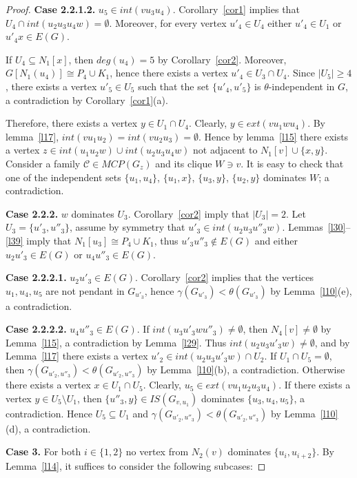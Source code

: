 \documentclass[12pt]{article}
\begin{document}
\begin{proof}
\textbf{Case 2.2.1.2.} $u_5 \in int(vu_3u_4)$. Corollary~\ref{cor1} implies that $U_4 \cap int(u_2u_3u_4w) = \emptyset$. Moreover, for every vertex $u'_4 \in U_4$ either $u'_4 \in U_1$ or $u'_4x \in E(G)$. 

If $U_4 \subseteq N_1[x]$, then $deg(u_4) = 5$ by Corollary~\ref{cor2}. Moreover, $G[N_1(u_4)] \cong P_4 \cup K_1$, hence there exists a vertex $u'_4 \in U_3 \cap U_4$. Since $|U_5| \geq 4$, there exists a vertex $u'_5 \in U_5$ such that the set $\{u'_4,u'_5\}$ is $\theta$-independent in $G$, a contradiction by Corollary~\ref{cor1}(a). 

Therefore, there exists a vertex $y \in U_1 \cap U_4$. Clearly, $y \in ext(vu_1wu_4)$. By lemma~\ref{l17}, $int(vu_1u_2) = int(vu_2u_3) = \emptyset$. Hence by lemma~\ref{l15} there exists a vertex $z \in int(u_1u_2w) \cup int(u_2u_3u_4w)$ not adjacent to $N_1[v] \cup \{x,y\}$. Consider a family $\mathcal{C} \in MCP(G_z)$ and its clique $W \ni v$. It is easy to check that one of the independent sets $\{u_1,u_4\}$, $\{u_1,x\}$, $\{u_3,y\}$, $\{u_2,y\}$ dominates $W$; a contradiction.

\textbf{Case 2.2.2.} $w$ dominates $U_3$. Corollary~\ref{cor2} imply that $|U_3| = 2$. Let $U_3 = \{u'_3,u''_3\}$, assume by symmetry that $u'_3 \in int(u_2u_3u''_3w)$. Lemmas~\ref{l30}--\ref{l39} imply that $N_1[u_3] \cong P_4 \cup K_1$, thus $u'_3u''_3 \notin E(G)$ and either $u_2u'_3 \in E(G)$ or $u_4u''_3 \in E(G)$. 

\textbf{Case 2.2.2.1.} $u_2u'_3 \in E(G)$. Corollary~\ref{cor2} implies that the vertices $u_1,u_4,u_5$ are not pendant in $G_{u'_3}$, hence $\gamma(G_{u'_3}) < \theta(G_{u'_3})$ by Lemma~\ref{l10}(e), a contradiction. 

\textbf{Case 2.2.2.2.} $u_4u''_3 \in E(G)$. If $int(u_3u'_3wu''_3) \neq \emptyset$, then $N_4[v] \neq \emptyset$ by Lemma~\ref{l15}, a contradiction by Lemma~\ref{l29}. Thus $int(u_2u_3u'_3w) \neq \emptyset$, and by Lemma~\ref{l17} there exists a vertex $u'_2 \in int(u_2u_3u'_3w) \cap U_2$. If $U_1 \cap U_5 = \emptyset$, then $\gamma(G_{u'_2,u''_3}) < \theta(G_{u'_2,u''_3})$ by Lemma~\ref{l10}(b), a contradiction. Otherwise there exists a vertex $x \in U_1 \cap U_5$. Clearly, $u_5 \in ext(vu_1u_2u_3u_4)$. If there exists a vertex $y \in U_5 \setminus U_1$, then $\{u''_3,y\} \in IS(G_{v,u_1})$ dominates $\{u_3,u_4,u_5\}$, a contradiction. Hence $U_5 \subseteq U_1$ and $\gamma(G_{u'_2,u''_3}) < \theta(G_{u'_2,u''_3})$ by Lemma~\ref{l10}(d), a contradiction.

\textbf{Case 3.} For both $i \in \{1,2\}$ no vertex from $N_2(v)$ dominates $\{u_i,u_{i+2}\}$. By Lemma~\ref{l14}, it suffices to consider the following subcases:


\end{proof}
\end{document}
